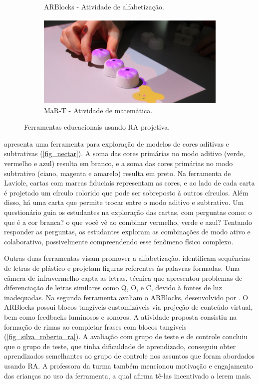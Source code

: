 \begin{figure}[h]
\begin{subfigure}{.49\textwidth}
        \caption{ARBlocks - Atividade de alfabetização.}
        \label{fig_silva_roberto_ra}
    \end{subfigure}
    \begin{subfigure}{.49\textwidth}
        \includegraphics[width=.9\linewidth,fbox]{figs/mart.png}
        \caption{MaR-T - Atividade de matemática.}
        \label{fig_math}
    \end{subfigure}
    \caption{Ferramentas educacionais usando RA projetiva.}
\end{figure}

 apresenta uma ferramenta para exploração de modelos de cores aditivas e subtrativas (\autoref{fig_nectar}). A soma das cores primárias no modo aditivo (verde, vermelho e azul) resulta em branco, e a soma das cores primárias no modo subtrativo (ciano, magenta e amarelo) resulta em preto. Na ferramenta de Laviole, cartas com marcas fiduciais representam as cores, e ao lado de cada carta é projetado um círculo colorido que pode ser sobreposto à outros círculos. Além disso, há uma carta que permite trocar entre o modo aditivo e subtrativo. Um questionário guia os estudantes na exploração das cartas, com perguntas como: o que é a cor branca? o que você vê ao combinar vermelho, verde e azul? Tentando responder as perguntas, os estudantes exploram as combinações de modo ativo e colaborativo, possivelmente compreendendo esse fenômeno físico complexo.

Outras duas ferramentas visam promover a alfabetização.  identificam sequências de letras de plástico e projetam figuras referentes às palavras formadas. Uma câmera de infravermelho capta as letras, técnica que apresentou problemas de diferenciação de letras similares como Q, O, e C, devido à fontes de luz inadequadas. Na segunda ferramenta  avaliam o ARBlocks, desenvolvido por . O ARBlocks possui blocos tangíveis customizáveis via projeção de conteúdo virtual, bem como feedbacks luminosos e sonoros. A atividade proposta consistiu na formação de rimas ao completar frases com blocos tangíveis (\autoref{fig_silva_roberto_ra}). A avaliação com grupo de teste e de controle concluiu que o grupo de teste, que tinha dificuldade de aprendizado, conseguiu obter aprendizados semelhantes ao grupo de controle nos assuntos que foram abordados usando RA. A professora da turma também mencionou motivação e engajamento das crianças no uso da ferramenta, a qual afirma tê-las incentivado a lerem mais.

